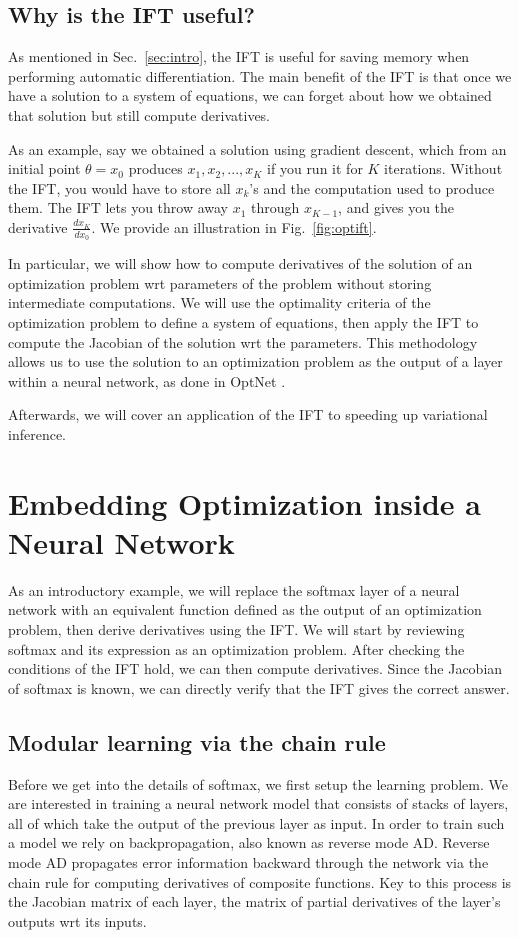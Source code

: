 \documentclass[11pt]{article}
\begin{document}
\subsection{Why is the IFT useful?}
As mentioned in Sec.~\ref{sec:intro}, the IFT is useful for saving memory when performing
automatic differentiation.
The main benefit of the IFT is that once we have a solution to a system of equations,
we can forget about how we obtained that solution but still compute derivatives.

As an example, say we obtained a solution using gradient descent,
which from an initial point $\theta = x_0$
produces $x_1, x_2, ..., x_{K}$ if you run it for $K$ iterations.
Without the IFT, you would have to store all $x_k$'s
and the computation used to produce them.
The IFT lets you throw away $x_1$ through $x_{K-1}$, and gives you the derivative
$\frac{dx_{K}}{dx_0}$.
We provide an illustration in Fig.~\ref{fig:optift}.

In particular, we will show how to compute derivatives of the solution of an optimization problem
wrt parameters of the problem without storing intermediate computations.
We will use the optimality criteria of the optimization problem to define a system of equations,
then apply the IFT to compute the Jacobian of the solution wrt the parameters.
This methodology allows us to use the solution to an optimization problem
as the output of a layer within a neural network,
as done in OptNet \citep{optnet}.

Afterwards, we will cover an application of the IFT to speeding up variational inference.

\section{Embedding Optimization inside a Neural Network}
As an introductory example,
we will replace the softmax layer of a neural network with an equivalent function
defined as the output of an optimization problem, then derive derivatives using the IFT.
We will start by reviewing softmax and its expression as an optimization problem.
After checking the conditions of the IFT hold, we can then compute derivatives.
Since the Jacobian of softmax is known, we can directly verify that the IFT gives
the correct answer.

\subsection{Modular learning via the chain rule}
Before we get into the details of softmax, we first setup the learning problem.
We are interested in training a neural network model that consists of stacks of layers,
all of which take the output of the previous layer as input.
In order to train such a model we rely on backpropagation,  also known as reverse mode AD.
Reverse mode AD propagates error information backward through the network via the chain rule
for computing derivatives of composite functions.
Key to this process is the Jacobian matrix of each layer, the matrix of partial derivatives
of the layer's outputs wrt its inputs.
\end{document}
